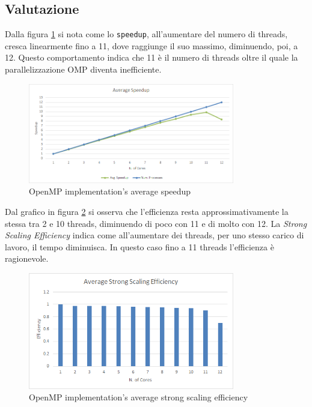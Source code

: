 \documentclass[a4paper, 12pt]{report}
\begin{document}
\subsection*{Valutazione}
\begin{sloppypar}
  \noindent
  Dalla figura \ref{fig:omp_speedup} si nota come lo \texttt{speedup}, all'aumentare del numero di threads, cresca linearmente fino
  a 11, dove raggiunge il suo massimo, diminuendo, poi, a 12. Questo comportamento indica che 11 è il numero di threads
  oltre il quale la parallelizzazione OMP diventa inefficiente.

  \begin{figure}[ht]
    \centering
    \includegraphics[width=9cm]{img/omp-speedup.png}
    \caption{OpenMP implementation's average speedup}
    \label{fig:omp_speedup}
  \end{figure}

  \noindent
  Dal grafico in figura \ref{fig:omp_sse} si osserva che l'efficienza resta approssimativamente la stessa tra 2 e 10 threads,
  diminuendo di poco con 11 e di molto con 12. La \textit{Strong Scaling Efficiency} indica come all'aumentare dei threads,
  per uno stesso carico di lavoro, il tempo diminuisca. In questo caso fino a 11 threads l'efficienza è ragionevole.

  \begin{figure}[ht]
    \centering
    \includegraphics[width=9cm]{img/omp-sse.png}
    \caption{OpenMP implementation's average strong scaling efficiency}
    \label{fig:omp_sse}
  \end{figure}


\end{sloppypar}
\end{document}
